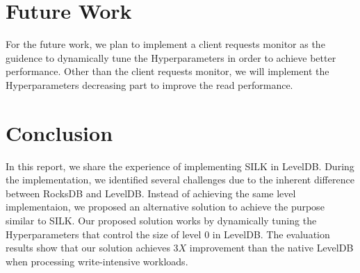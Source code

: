 \documentclass[letter,twocolumn,10pt]{article}
\begin{document}
\section{Future Work}
\label{sec:futurework}
For the future work, we plan to implement a client requests monitor as the guidence to dynamically tune the Hyperparameters in order to achieve better performance. Other than the client requests monitor, we will implement the Hyperparameters decreasing part to improve the read performance. 

\section{Conclusion}
\label{sec:conclusion}
In this report, we share the experience of implementing SILK in LevelDB. During the implementation, we identified several challenges due to the inherent difference between RocksDB and LevelDB. Instead of achieving the same level implementaion, we proposed an alternative solution to achieve the purpose similar to SILK. Our proposed solution works by dynamically tuning the Hyperparameters that control the size of level $0$ in LevelDB. The evaluation results show that our solution achieves $3X$ improvement than the native LevelDB when processing write-intensive workloads.  

{\footnotesize 


}
\end{document}
